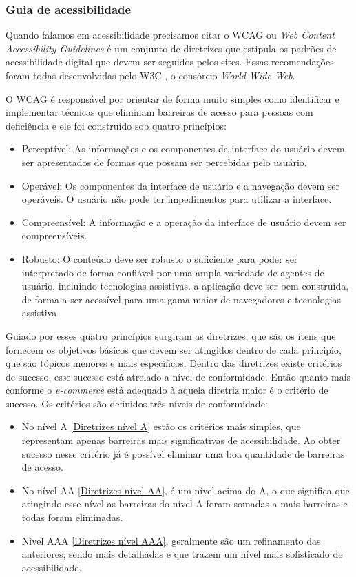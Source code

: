 \subsubsection{Guia de acessibilidade}
{Quando falamos em acessibilidade precisamos citar o WCAG \cite{WCAG} ou \textit{Web Content Accessibility Guidelines} é um conjunto de diretrizes que estipula os padrões de acessibilidade digital que devem ser seguidos pelos sites. Essas recomendações foram todas desenvolvidas pelo W3C \cite{W3C}, o consórcio \textit{World Wide Web}.

O WCAG é responsável por orientar de forma muito simples como identificar e implementar técnicas que eliminam barreiras de acesso para pessoas com deficiência e ele foi construído sob quatro princípios:
\begin{itemize}
\item Perceptível: As informações e os componentes da interface do usuário devem ser apresentados de formas que possam ser percebidas pelo usuário.
\item Operável: Os componentes da interface de usuário e a navegação devem ser operáveis. O usuário não pode ter impedimentos para utilizar a interface.
\item Compreensível: A informação e a operação da interface de usuário devem ser compreensíveis. 
\item Robusto: O conteúdo deve ser robusto o suficiente para poder ser interpretado de forma confiável por uma ampla variedade de agentes de usuário, incluindo tecnologias assistivas. a aplicação deve ser bem construída, de forma a ser acessível para uma gama maior de navegadores e tecnologias assistiva
\end{itemize}

Guiado por esses quatro princípios surgiram as diretrizes, que são os itens que fornecem os objetivos básicos que devem ser atingidos dentro de cada principio, que são tópicos menores e mais específicos. Dentro das diretrizes existe critérios de sucesso, esse sucesso está atrelado a nível de conformidade. Então quanto mais conforme o \textit{e-commerce} está adequado à aquela diretriz maior é o critério de sucesso. Os critérios são definidos três níveis de conformidade:
\begin{itemize}
\item No nível A \ref{Diretrizes nível A} estão os critérios mais simples, que representam apenas barreiras mais significativas de acessibilidade. Ao obter sucesso nesse critério já é possível eliminar uma boa quantidade de barreiras de acesso. 
\item No nível AA \ref{Diretrizes nível AA}, é um nível acima do A, o que significa que atingindo esse nível as barreiras do nível A foram somadas a mais barreiras e todas foram eliminadas.
\item Nível AAA \ref{Diretrizes nível AAA}, geralmente são um refinamento das anteriores, sendo mais detalhadas e que trazem um nível mais sofisticado de acessibilidade.
\end{itemize}

}
